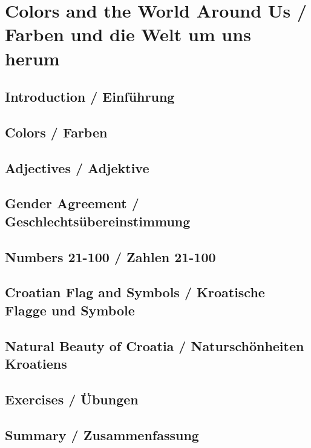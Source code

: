 \chapter{Colors and the World Around Us / Farben und die Welt um uns herum}

\section{Introduction / Einführung}

\section{Colors / Farben}

\section{Adjectives / Adjektive}

\section{Gender Agreement / Geschlechtsübereinstimmung}

\section{Numbers 21-100 / Zahlen 21-100}

\section{Croatian Flag and Symbols / Kroatische Flagge und Symbole}

\section{Natural Beauty of Croatia / Naturschönheiten Kroatiens}

\section{Exercises / Übungen}

\section{Summary / Zusammenfassung}
